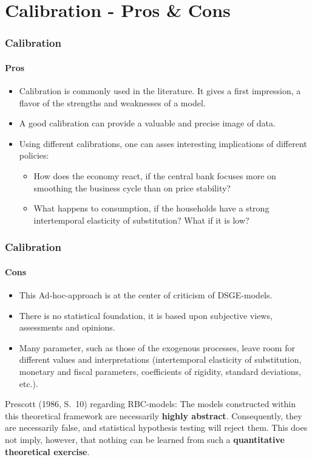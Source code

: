 \documentclass[handout]{beamer}  %
\begin{document}
\section{Calibration - Pros \& Cons}
\begin{frame}\frametitle{Calibration}\framesubtitle{Pros}
\begin{itemize}
   \item Calibration is commonly used in the literature. It gives a first
       impression, a flavor of the strengths and weaknesses of a model.
   \item A good calibration can provide a valuable and precise image of
       data.
   \item Using different calibrations, one can asses interesting
       implications of different policies:
       \begin{itemize}
       \item How does the economy react, if the central bank focuses
           more on smoothing the business cycle than on price
           stability?
           \item What happens to consumption, if the households have
               a strong intertemporal elasticity of substitution?
               What if it is low?
       \end{itemize}
\end{itemize}
\end{frame}

\begin{frame}\frametitle{Calibration}\framesubtitle{Cons}
\begin{itemize}
   \item This Ad-hoc-approach is at the center of criticism of
       DSGE-models.
   \item There is no statistical foundation, it is based upon subjective
       views, assessments and opinions.
   \item Many parameter, such as those of the exogenous processes, leave
       room for different values and interpretations (intertemporal
       elasticity of substitution, monetary and fiscal parameters,
       coefficients of rigidity, standard deviations, etc.).
\end{itemize}
\begin{block}{Prescott (1986, S.~10) regarding RBC-models:} The models constructed within this theoretical framework are
necessarily \textbf{highly abstract}. Consequently, they are necessarily
false, and statistical hypothesis testing will reject them. This does not
imply, however, that nothing can be learned from such a \textbf{quantitative
theoretical exercise}.\end{block}
\end{frame}
\end{document}
